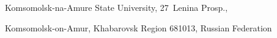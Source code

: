 \noindent


Komsomolsk-na-Amure State University, 27~Lenina Prosp.,  


Komsomolsk-on-Amur, Khabarovsk Region 681013, Russian Federation





\def\leftfootline{\small{\textbf{\thepage}


\hfill INFORMATIKA I EE PRIMENENIYA~--- INFORMATICS AND


APPLICATIONS\ \ \ 2020\ \ \ volume~14\ \ \ issue\ 1}


}%


 \def\rightfootline{\small{INFORMATIKA I EE PRIMENENIYA~---


INFORMATICS AND APPLICATIONS\ \ \ 2020\ \ \ volume~14\ \ \ issue\ 1


\hfill \textbf{\thepage}}}





\vspace*{3pt} 











